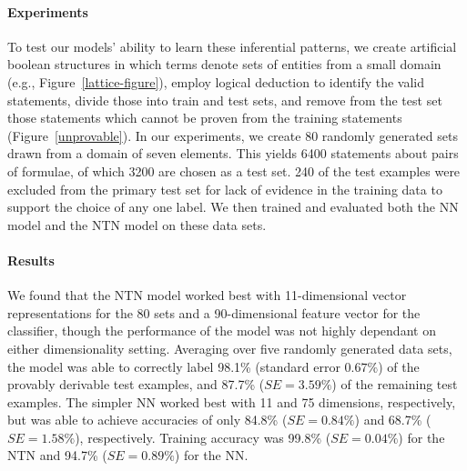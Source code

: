 \documentclass[letterpaper]{article}
\begin{document}
\paragraph{Experiments}
To test our models' ability to learn these inferential patterns, we
create artificial boolean structures in which terms denote sets of entities from
a small domain (e.g., Figure~\ref{lattice-figure}), employ logical
deduction to identify the valid statements, divide those into train
and test sets, and remove from the test set those statements which
cannot be proven from the training statements
(Figure~\ref{unprovable}). 
%
%
%
In our experiments, we create 80 randomly generated sets drawn from a
domain of seven elements. This yields 6400 statements about pairs of
formulae, of which 3200 are chosen as a test set. 240 of the test examples 
were excluded from the primary test set for lack of evidence in the training 
data to support the choice of any one label. 
We then trained and evaluated both the NN model and the NTN model on these data sets. 

\paragraph{Results} 
We found that the NTN model worked best with 11-dimensional vector
representations for the 80 sets and a 90-dimensional feature vector
for the classifier, though the performance of the model was not highly
dependant on either dimensionality setting. 
Averaging over five randomly generated data sets, the model was able to correctly label 98.1\% (standard error $0.67\%$) of the provably derivable test examples, and 87.7\%
($\textit{SE} = 3.59\%$) of the remaining test examples. The simpler NN worked
best with 11 and 75 dimensions, respectively, but was able to achieve
accuracies of only 84.8\% ($\textit{SE} = 0.84\%$) and 68.7\% ($\textit{SE} = 1.58\%$),
respectively. Training accuracy was 99.8\% ($\textit{SE} = 0.04\%$) for the NTN and 94.7\% ($\textit{SE} = 0.89\%$) for
the NN.
\end{document}

